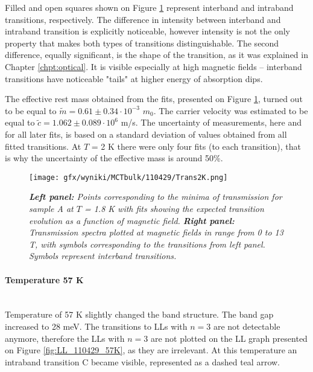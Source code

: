 \documentclass[titlepage,a4paper]{book}
\newcommand{\wciecie}{\quad\phantom{v}}
\newcommand{\myparagraph}[1]{\paragraph{#1}\mbox{}\\}
\begin{document}
Filled and open squares shown on Figure \ref{fig:Spectra_110429_2K} represent interband and intraband transitions, respectively. The difference in intensity between interband and intraband transition is explicitly noticeable, however intensity is not the only property that makes both types of transitions distinguishable. The second difference, equally significant, is the shape of the transition, as it was explained in Chapter \ref{chpt:optical}. It is visible especially at high magnetic fields -- interband transitions have noticeable "tails" at higher energy of absorption dips.

The effective rest mass obtained from the fits, presented on Figure \ref{fig:Spectra_110429_2K}, turned out to be equal to $\tilde m = 0.61 \pm 0.34 \cdot 10^{-3}$ $m_0$. The carrier velocity was estimated to be equal to $\tilde{c} = 1.062 \pm 0.089 \cdot 10^6$ m/s. The uncertainty of measurements, here and for all later fits, is based on a standard deviation of values obtained from all fitted transitions. At $T$ = 2 K there were only four fits (to each transition), that is why the uncertainty of the effective mass is around 50\%.

\begin{figure}[H]
	\centering
	\texttt{[image: gfx/wyniki/MCTbulk/110429/Trans2K.png]}
	\vspace{-10pt}
	\caption{\textit{\textbf{Left panel:} Points corresponding to the minima of transmission for sample A at $T$ = 1.8 K with fits showing the expected transition evolution as a function of magnetic field. \textbf{Right panel:} Transmission spectra plotted at magnetic fields in range from 0 to 13 T, with symbols corresponding to the transitions from left panel. Symbols represent interband transitions.}}
	\label{fig:Spectra_110429_2K}
\end{figure} 

\clearpage
\myparagraph{Temperature 57 K}
\wciecie
Temperature of 57 K slightly changed the band structure. The band gap increased to 28 meV. The transitions to LLs with $n = 3$ are not detectable anymore, therefore the LLs with $n = 3$ are not plotted on the LL graph presented on Figure \ref{fig:LL_110429_57K}, as they are irrelevant. At this temperature an intraband transition C became visible, represented as a dashed teal arrow.
\end{document}
